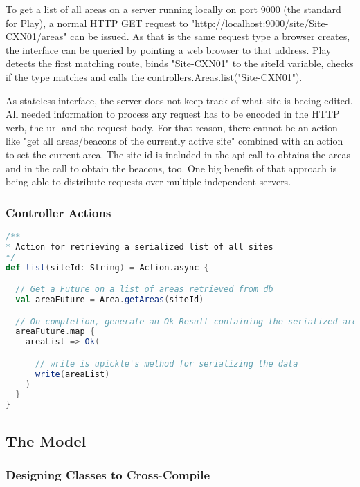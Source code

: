 To get a list of all areas on a server running locally on port 9000 (the standard for Play), a normal HTTP GET request to "http://localhost:9000/site/Site-CXN01/areas" can be issued. As that is the same request type a browser creates, the interface can be queried by  pointing a web browser to that address.
Play detects the first matching route, binds "Site-CXN01" to the siteId variable, checks if the type matches and calls the  controllers.Areas.list("Site-CXN01").

As stateless interface, the server does not keep track of what site is beeing edited. All needed information to process any request has to be encoded in the HTTP verb, the url and the request body. For that reason, there cannot be an action like "get all areas/beacons of the currently active site" combined with an action to set the current area. The site id is included in the api call to obtains the areas and in the call to obtain the beacons, too. One big benefit of that approach is being able to distribute requests over multiple independent servers. 


\subsubsection{Controller Actions}

\begin{lstlisting}[caption={An exemplary controller action},basicstyle=\footnotesize\ttfamily,language=scala,aboveskip=15pt]
/**
* Action for retrieving a serialized list of all sites
*/
def list(siteId: String) = Action.async {

  // Get a Future on a list of areas retrieved from db
  val areaFuture = Area.getAreas(siteId)

  // On completion, generate an Ok Result containing the serialized area list
  areaFuture.map {
    areaList => Ok(

      // write is upickle's method for serializing the data
      write(areaList)
    )
  }
}
\end{lstlisting}

\subsection{The Model}

\subsubsection{Designing Classes to Cross-Compile}

